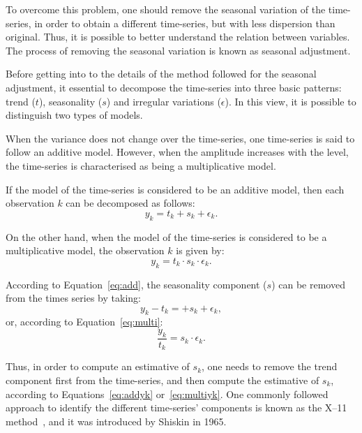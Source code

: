 To overcome this problem, one should remove the seasonal variation of the time-series, in order to obtain a different time-series, but with less dispersion than original. Thus, it is possible to better understand the relation between variables. The process of removing the seasonal variation is known as seasonal adjustment.

Before getting into to the details of the method followed for the seasonal adjustment, it essential to decompose the time-series into three basic patterns: trend ($t$), seasonality ($s$) and irregular variations ($\epsilon$). In this view, it is possible to distinguish two types of models. 

When the variance does not change over the time-series, one time-series is said to follow an additive model. However, when the amplitude increases with the level, the time-series is characterised as being a multiplicative model.

If the model of the time-series is considered to be an additive model, then each observation $k$ can be decomposed as follows: 
\begin{equation}\label{eq:add}
    y_k = t_k + s_k + \epsilon_k.
\end{equation}

On the other hand, when the model of the time-series is considered to be a multiplicative model, the observation $k$ is given by:
\begin{equation}\label{eq:multi}
    y_k = t_k \cdot s_k \cdot \epsilon_k.
\end{equation}

According to Equation~\eqref{eq:add}, the seasonality component ($s$) can be removed from the times series by taking:
\begin{equation}\label{eq:addyk}
    y_k - t_k  =  + s_k + \epsilon_k,
\end{equation}
or, according to Equation~\eqref{eq:multi}:
\begin{equation}\label{eq:multiyk}
    \dfrac{y_k}{t_k} = s_k \cdot \epsilon_k.
\end{equation}

Thus, in order to compute an estimative of $s_k$, one needs to remove the trend component first from the time-series, and then compute the estimative of $s_k$, according to Equations~\eqref{eq:addyk} or~\eqref{eq:multiyk}. One commonly followed approach to identify the different time-series' components is known as the X--11 method~\cite{shiskin1965x}, and it was introduced by Shiskin in 1965.

